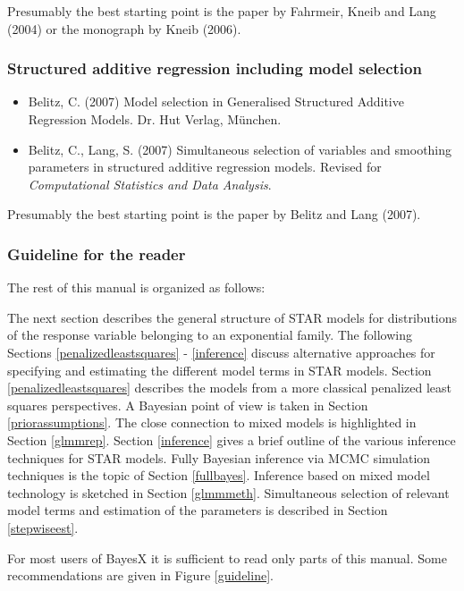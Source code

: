 \documentclass[11pt,a4paper,twoside]{bayesxarticle}
\begin{document}
Presumably the best starting point is the paper by Fahrmeir, Kneib and Lang (2004) or the monograph by Kneib (2006).

\subsubsection*{Structured additive regression including model selection}

\begin{itemize}
\item Belitz, C. (2007) Model selection in Generalised Structured Additive Regression Models. Dr. Hut Verlag, M\"{u}nchen.
\item Belitz, C., Lang, S. (2007) Simultaneous selection of variables and smoothing parameters
in structured additive regression models. Revised for {\it
Computational Statistics and Data Analysis}.
\end{itemize}

Presumably the best starting point is the paper by Belitz and Lang (2007).

\subsubsection*{Guideline for the reader}


The rest of this manual is organized as follows:

The next section describes the general structure of STAR models for
distributions of the response variable belonging to an exponential
family. The following Sections \ref{penalizedleastsquares} -
\ref{inference} discuss alternative approaches for specifying and
estimating the different model terms in STAR models. Section
\ref{penalizedleastsquares} describes the models from a more
classical penalized least squares perspectives. A Bayesian point of
view is taken in Section \ref{priorassumptions}. The close
connection to mixed models is highlighted in Section \ref{glmmrep}.
Section \ref{inference} gives a brief outline of the various
inference techniques for STAR models. Fully Bayesian inference via
MCMC simulation techniques is the topic of Section \ref{fullbayes}.
Inference based on mixed model technology is sketched in Section
\ref{glmmmeth}. Simultaneous selection of relevant model terms and
estimation of the parameters is described in Section
\ref{stepwiseest}.

For most users of BayesX it is sufficient to read only parts of this
manual. Some recommendations are given in Figure \ref{guideline}.
\end{document}

